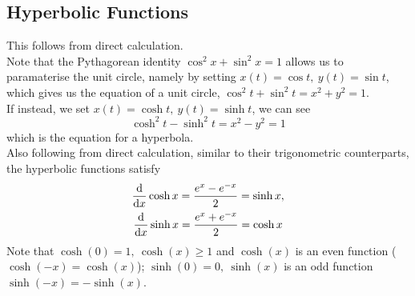 \documentclass{report}
\begin{document}
\subsection{Hyperbolic Functions}
This follows from direct calculation. \\

Note that the Pythagorean identity $\cos^2x + \sin^2x = 1$ allows us to paramaterise the unit circle, namely by setting $x(t)=\cos t,\ y(t)=\sin t$, which gives us the equation of a unit circle, $\cos^2t+\sin^2t = x^2 + y^2 = 1$. \\

If instead, we set $x(t)=\cosh t,\ y(t)=\sinh t$, we can see
$$
  \cosh^2t - \sinh^2t = x^2 - y^2 = 1
$$
which is the equation for a hyperbola. \\
Also following from direct calculation, similar to their trigonometric counterparts, the hyperbolic functions satisfy
\begin{gather*}
  \frac{\mathrm{d}}{\mathrm{d} x}\cosh x = \frac{e^x - e^{-x}}{2} = \sinh x,\\ 
  \frac{\mathrm{d}}{\mathrm{d} x}\sinh x = \frac{e^x + e^{-x}}{2} = \cosh x
\end{gather*}
Note that $\cosh(0)=1,\ \cosh(x)\geq1$ and $\cosh(x)$ is an even function ($\cosh(-x) = \cosh(x)$); $\sinh(0)=0,\ \sinh(x)$ is an odd function $\sinh(-x) = -\sinh(x)$.


\begin{center}
\end{center}
\end{document}
